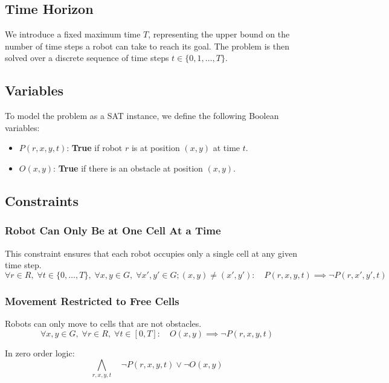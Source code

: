 \documentclass[8pt]{article}
\begin{document}
\subsection{Time Horizon}
We introduce a fixed maximum time $T$, representing the upper bound on the number of time steps a robot can take to reach its goal. The problem is then solved over a discrete sequence of time steps $t \in \{0, 1, \dots, T\}$.

\subsection{Variables}
To model the problem as a SAT instance, we define the following Boolean variables:
\begin{itemize}
    \item $P(r, x, y, t)$: \textbf{True} if robot $r$ is at position $(x, y)$ at time $t$.
    \item $O(x, y)$: \textbf{True} if there is an obstacle at position $(x,y)$.
\end{itemize}

\subsection{Constraints}
\subsubsection{Robot Can Only Be at One Cell At a Time}
This constraint ensures that each robot occupies only a single cell at any given time step.
\[
\forall r \in R,\;\forall t \in \{0,\dots,T\},\;\forall x,y \in G,\;\forall x',y' \in G; (x,y)\neq(x',y'):\quad P(r,x,y,t) \implies \neg P(r,x',y',t)
\]

\subsubsection{Movement Restricted to Free Cells}
Robots can only move to cells that are not obstacles.
\[
\forall x,y \in G,\; \forall r \in R,\; \forall t \in [0,T]:\quad O(x,y) \implies \neg P(r,x,y,t)
\]

In zero order logic:
\[
    \bigwedge_{r,x,y,t} \quad \neg P(r,x,y,t) \lor \neg O(x,y)
\]
\end{document}
